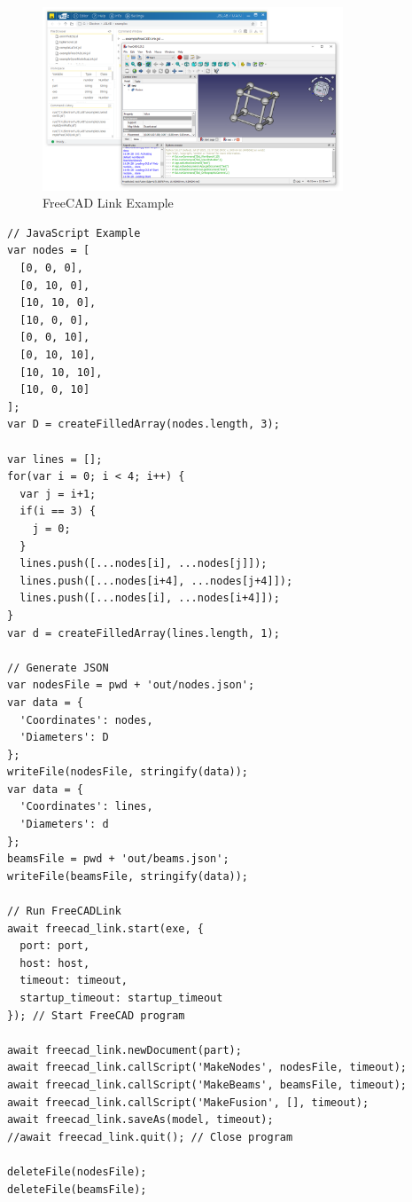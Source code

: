 \documentclass[12pt,a4paper]{article}
\begin{document}
\begin{figure}[H]
    \centering
    \includegraphics[width=0.8\textwidth]{resources/JSLAB_FreeCADLink.png}
    \caption{FreeCAD Link Example}
    \label{fig:freecad-link}
\end{figure}

\begin{lstlisting}[style=JavaScriptStyle]
// JavaScript Example
var nodes = [
  [0, 0, 0],
  [0, 10, 0],
  [10, 10, 0],
  [10, 0, 0],
  [0, 0, 10],
  [0, 10, 10],
  [10, 10, 10],
  [10, 0, 10]
];
var D = createFilledArray(nodes.length, 3);

var lines = [];
for(var i = 0; i < 4; i++) {
  var j = i+1;
  if(i == 3) {
    j = 0;
  }
  lines.push([...nodes[i], ...nodes[j]]);
  lines.push([...nodes[i+4], ...nodes[j+4]]);
  lines.push([...nodes[i], ...nodes[i+4]]);
}
var d = createFilledArray(lines.length, 1);

// Generate JSON
var nodesFile = pwd + 'out/nodes.json';
var data = {
  'Coordinates': nodes,
  'Diameters': D
};
writeFile(nodesFile, stringify(data));
var data = {
  'Coordinates': lines,
  'Diameters': d
};
beamsFile = pwd + 'out/beams.json';
writeFile(beamsFile, stringify(data));

// Run FreeCADLink 
await freecad_link.start(exe, {
  port: port,
  host: host,
  timeout: timeout,
  startup_timeout: startup_timeout
}); // Start FreeCAD program

await freecad_link.newDocument(part);
await freecad_link.callScript('MakeNodes', nodesFile, timeout);
await freecad_link.callScript('MakeBeams', beamsFile, timeout);
await freecad_link.callScript('MakeFusion', [], timeout);
await freecad_link.saveAs(model, timeout);
//await freecad_link.quit(); // Close program

deleteFile(nodesFile);
deleteFile(beamsFile);
\end{lstlisting}

\end{document}
